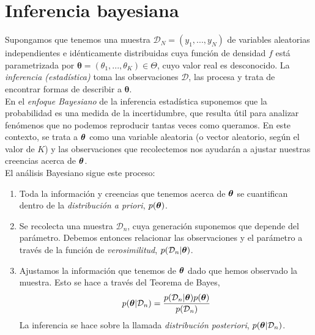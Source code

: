 \section{Inferencia bayesiana}

Supongamos que tenemos una muestra $\mathcal D_N = \left(y_1,...,y_N\right)$ de variables aleatorias independientes e idénticamente distribuidas 
cuya función de densidad $f$ está parametrizada por $\boldsymbol{\theta} = (\theta_1,...,\theta_K) \in \Theta$, cuyo valor real es desconocido. 
La \textit{inferencia (estadística)} toma las observaciones $\mathcal D$, las procesa y trata de encontrar formas de describir a $\boldsymbol{\theta}$. \\

En el \textit{enfoque Bayesiano} de la inferencia estadística suponemos que la probabilidad es una medida de la incertidumbre, que resulta útil para analizar fenómenos que no podemos reproducir tantas veces como queramos. En este contexto, se trata a $\boldsymbol{\theta}$ como una variable aleatoria (o vector aleatorio, según el valor de $K$) y las observaciones que recolectemos nos ayudarán a ajustar nuestras creencias acerca de $\boldsymbol{\theta}$.\\

El análisis Bayesiano sigue este proceso: 

\begin{enumerate}
    \item Toda la información y creencias que tenemos acerca de $\boldsymbol{\theta}$ se cuantifican dentro de la \textit{distribución a priori}, $p(\boldsymbol{\theta})$.
    \item Se recolecta una muestra $\mathcal D_n$, cuya generación suponemos que depende del parámetro. Debemos entonces relacionar las observaciones y el parámetro a través de la función de \textit{verosimilitud}, $p(\mathcal D_n|\boldsymbol{\theta})$.
    \item Ajustamos la información que tenemos de $\boldsymbol{\theta}$ dado que hemos observado la muestra. Esto se hace a través del Teorema de Bayes,
    $$p(\boldsymbol{\theta}|\mathcal D_n) = \frac{p(\mathcal D_n|\boldsymbol{\theta})p(\boldsymbol{\theta})}{p(\mathcal D_n)}$$
    La inferencia se hace sobre la llamada \textit{distribución posteriori}, $p(\boldsymbol{\theta}|\mathcal D_n)$.
\end{enumerate}




